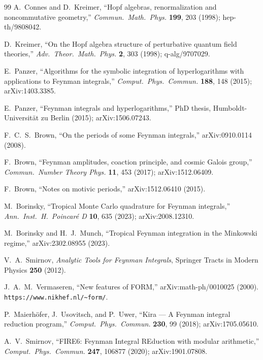 \documentclass[11pt,a4paper]{article}
\theoremstyle{definition}
\theoremstyle{plain}
\begin{document}
\begin{thebibliography}{99}
  A.~Connes and D.~Kreimer,
  ``Hopf algebras, renormalization and noncommutative geometry,''
  \textit{Commun.\ Math.\ Phys.} \textbf{199}, 203 (1998);
  hep-th/9808042.

  D.~Kreimer,
  ``On the Hopf algebra structure of perturbative quantum field theories,''
  \textit{Adv.\ Theor.\ Math.\ Phys.} \textbf{2}, 303 (1998);
  q-alg/9707029.

  E.~Panzer,
  ``Algorithms for the symbolic integration of hyperlogarithms with
  applications to Feynman integrals,''
  \textit{Comput.\ Phys.\ Commun.} \textbf{188}, 148 (2015);
  arXiv:1403.3385.

  E.~Panzer,
  ``Feynman integrals and hyperlogarithms,''
  PhD thesis, Humboldt-Universit\"at zu Berlin (2015);
  arXiv:1506.07243.

  F.~C.~S.~Brown,
  ``On the periods of some Feynman integrals,''
  arXiv:0910.0114 (2008).

  F.~Brown,
  ``Feynman amplitudes, coaction principle, and cosmic Galois group,''
  \textit{Commun.\ Number Theory Phys.} \textbf{11}, 453 (2017);
  arXiv:1512.06409.

  F.~Brown,
  ``Notes on motivic periods,''
  arXiv:1512.06410 (2015).

  M.~Borinsky,
  ``Tropical Monte Carlo quadrature for Feynman integrals,''
  \textit{Ann.\ Inst.\ H.\ Poincar\'e D} \textbf{10}, 635 (2023);
  arXiv:2008.12310.

  M.~Borinsky and H.~J.~Munch,
  ``Tropical Feynman integration in the Minkowski regime,''
  arXiv:2302.08955 (2023).

  V.~A.~Smirnov,
  \textit{Analytic Tools for Feynman Integrals},
  Springer Tracts in Modern Physics \textbf{250} (2012).

  J.~A.~M.~Vermaseren,
  ``New features of FORM,''
  arXiv:math-ph/0010025 (2000).
  \texttt{https://www.nikhef.nl/{\textasciitilde}form/}.

  P.~Maierh\"ofer, J.~Usovitsch, and P.~Uwer,
  ``Kira --- A Feynman integral reduction program,''
  \textit{Comput.\ Phys.\ Commun.} \textbf{230}, 99 (2018);
  arXiv:1705.05610.

  A.~V.~Smirnov,
  ``FIRE6: Feynman Integral REduction with modular arithmetic,''
  \textit{Comput.\ Phys.\ Commun.} \textbf{247}, 106877 (2020);
  arXiv:1901.07808.


\end{thebibliography}
\end{document}
